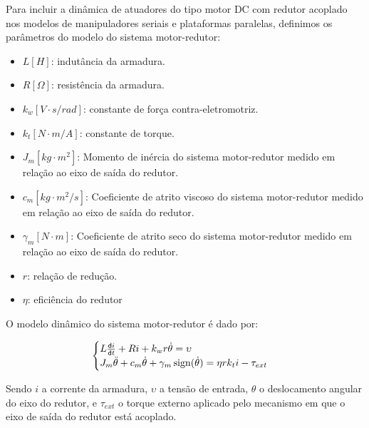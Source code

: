 \documentclass[a4paper,11pt,brazil,fleqn]{article}
\begin{document}

Para incluir a din\^amica de atuadores do tipo motor DC com redutor acoplado nos modelos de manipuladores seriais e plataformas paralelas, definimos os par\^ametros do modelo do sistema motor-redutor:

\begin{itemize}
\item $L [H]$: indut\^ancia da armadura.
\item $R [\Omega]$: resist\^encia da armadura.
\item $k_w [V \cdot s / rad]$: constante de for\c{c}a contra-eletromotriz.
\item $k_t[N \cdot m / A]$: constante de torque.
\item $J_m [kg \cdot m^2]$: Momento de in\'ercia do sistema motor-redutor medido em rela\c{c}\~ao ao eixo de sa\'ida do redutor.
\item $c_m [kg \cdot m^2/s]$: Coeficiente de atrito viscoso do sistema motor-redutor medido em rela\c{c}\~ao ao eixo de sa\'ida do redutor.
\item $\gamma_m [N \cdot m]$: Coeficiente de atrito seco do sistema motor-redutor medido em rela\c{c}\~ao ao eixo de sa\'ida do redutor.
\item $r$: rela\c{c}\~ao de redu\c{c}\~ao.
\item $\eta$: efici\^encia do redutor
\end{itemize}

O modelo din\^amico do sistema motor-redutor \'e dado por:

\begin{equation} \label{eq:Motor}
\begin{cases}
L \frac{\mathsf{d} i}{\mathsf{d} t} + R i + k_w r \dot{\theta} = \upsilon \\
J_m \ddot{\theta} + c_m \dot{\theta} + \gamma_m \operatorname*{sign}(\dot{\theta}) = \eta r k_t i - \tau_{ext}
\end{cases}
\end{equation}

Sendo $i$ a corrente da armadura, $\upsilon$ a tens\~ao de entrada, $\theta$ o deslocamento angular do eixo do redutor, e $\tau_{ext}$ o torque externo aplicado pelo mecanismo em que o eixo de sa\'ida do redutor est\'a acoplado. \\
\end{document}
